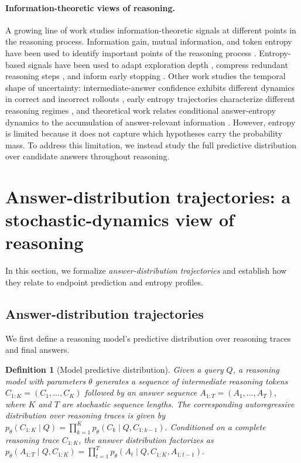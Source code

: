 \documentclass{article}
\newtheorem{definition}{Definition}
\begin{document}
\paragraph{Information-theoretic views of reasoning.}
A growing line of work studies information-theoretic signals at different points in the reasoning process. Information gain, mutual information, and token entropy have been used to identify important points of the reasoning process \cite{ton2025understandingchainofthoughtllmsinformation,qian2025demystifyingreasoningdynamicsmutual,NEURIPS2025_a797c2d2}. Entropy-based signals have been used to adapt exploration depth \cite{zhang2025entropy}, compress redundant reasoning steps \cite{ICLR2026_40b2844d}, and inform early stopping \cite{sharma2025thinkjustenoughsequencelevel,hosseini2026early}. Other work studies the temporal shape of uncertainty: intermediate-answer confidence exhibits different dynamics in correct and incorrect rollouts \cite{hosseini2026early}, early entropy trajectories characterize different reasoning regimes \cite{xia2026llms}, and theoretical work relates conditional answer-entropy dynamics to the accumulation of answer-relevant information \cite{català2026stepwiseinformativenessassumptionentropy}. However, entropy is limited because it does not capture which hypotheses carry the probability mass. To address this limitation, we instead study the full predictive distribution over candidate answers throughout reasoning.


\section{Answer-distribution trajectories: a stochastic-dynamics view of reasoning}
\label{sec:framework}

In this section, we formalize \emph{answer-distribution trajectories} and establish how they relate to endpoint prediction and entropy profiles.

\subsection{Answer-distribution trajectories}
\label{sec:trajectories}

We first define a reasoning model's predictive distribution over reasoning traces and final answers.

\begin{definition}[Model predictive distribution]
Given a query \(Q\), a reasoning model with parameters \(\theta\) generates a sequence of intermediate reasoning tokens
\(
C_{1:K} = (C_1,\dots,C_K)
\)
followed by an answer sequence
\(
A_{1:T} = (A_1,\dots,A_T),
\)
where $K$ and $T$ are stochastic sequence lengths. The corresponding autoregressive distribution over reasoning traces is given by 
$p_\theta(C_{1:K}\mid Q)
=
\prod_{k=1}^{K}
p_\theta(C_k\mid Q,C_{1:k-1}).$
Conditioned on a complete reasoning trace \(C_{1:K}\), the answer distribution factorizes as
$
p_\theta(A_{1:T}\mid Q,C_{1:K})
=
\prod_{t=1}^{T}
p_\theta(A_t\mid Q,C_{1:K},A_{1:t-1}).
$
\label{def:modelpredictive}
\end{definition}
\end{document}
